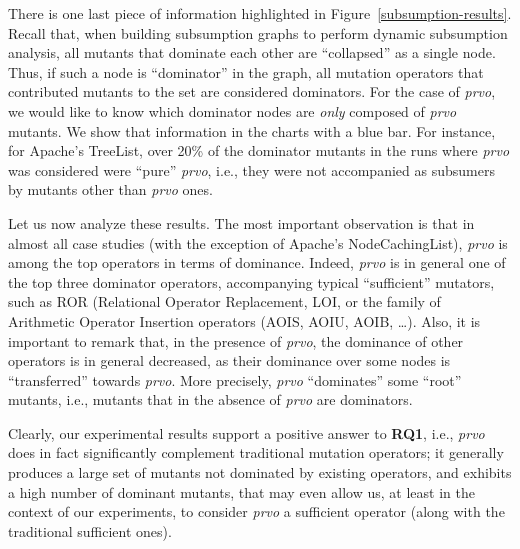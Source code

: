 There is one last piece of information highlighted in Figure~\ref{subsumption-results}. Recall that, when building subsumption graphs to perform dynamic subsumption analysis, all mutants that dominate each other are ``collapsed'' as a single node. Thus, if such a node is ``dominator'' in the graph, all mutation operators that contributed mutants to the set are considered dominators. For the case of \emph{prvo}, we would like to know which dominator nodes are \emph{only} composed of \emph{prvo} mutants. We show that information in the charts with a blue bar. For instance, for Apache's TreeList, over 20\% of the dominator mutants in the runs where \emph{prvo} was considered were ``pure'' \emph{prvo}, i.e., they were not accompanied as subsumers by mutants other than \emph{prvo} ones. 

Let us now analyze these results. The most important observation is that in almost all case studies (with the exception of Apache's NodeCachingList), \emph{prvo} is among the top operators in terms of dominance. Indeed, \emph{prvo} is in general one of the top three dominator operators, accompanying typical ``sufficient'' mutators, such as ROR (Relational Operator Replacement, LOI, or the family of Arithmetic Operator Insertion operators (AOIS, AOIU, AOIB, \dots). Also, it is important to remark that, in the presence of \emph{prvo}, the dominance of other operators is in general decreased, as their dominance over some nodes is ``transferred'' towards \emph{prvo}. More precisely, \emph{prvo} ``dominates'' some ``root'' mutants, i.e., mutants that in the absence of \emph{prvo} are dominators.    

Clearly, our experimental results support a positive answer to \textbf{RQ1}, i.e., \emph{prvo} does in fact significantly complement traditional mutation operators; it generally produces a large set of mutants not dominated by existing operators, and exhibits a high number of dominant mutants, that may even allow us, at least in the context of our experiments, to consider \emph{prvo} a sufficient operator (along with the traditional sufficient ones). 

